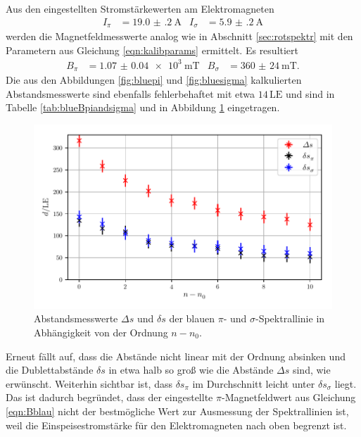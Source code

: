 Aus den eingestellten Stromstärkewerten am Elektromagneten
\begin{align}
  I_\pi &= \SI{19.0(2)}{\ampere} & I_\sigma &= \SI{5.9(2)}{\ampere}
\end{align}
werden die Magnetfeldmesswerte analog wie in Abschnitt \ref{sec:rotspektr} mit
den Parametern aus Gleichung \ref{eqn:kalibparams} ermittelt. Es resultiert
\begin{align}
  B_\pi &= \SI{1.07(4)e3}{\milli\tesla} & B_\sigma &= \SI{360(24)}{\milli\tesla}.
  \label{eqn:Bblau}
\end{align}
Die aus den Abbildungen \ref{fig:bluepi} und \ref{fig:bluesigma} kalkulierten Abstandsmesswerte
sind ebenfalls fehlerbehaftet mit etwa $14 \, \text{LE}$ und sind in Tabelle
\ref{tab:blueBpiandsigma} und in Abbildung \ref{fig:blueds} eingetragen.

\begin{figure}[H]
  \centering
  \includegraphics{Zusatzplots/blue_ds.pdf}
  \caption{Abstandsmesswerte $\Delta s$ und $\delta s$ der blauen $\pi$- und $\sigma$-Spektrallinie in Abhängigkeit von der Ordnung $n-n_0$.}
  \label{fig:blueds}
\end{figure}

Erneut fällt auf, dass die Abstände nicht linear mit der Ordnung absinken und die Dublettabstände $\delta s$ in etwa
halb so groß wie die Abstände $\Delta s$ sind, wie erwünscht. Weiterhin sichtbar ist, dass $\delta s_\pi$ im Durchschnitt
leicht unter $\delta s_\sigma$ liegt. Das ist dadurch begründet, dass der eingestellte $\pi$-Magnetfeldwert aus
Gleichung \eqref{eqn:Bblau} nicht der bestmögliche Wert zur Ausmessung der Spektrallinien ist, weil die Einspeisestromstärke
für den Elektromagneten nach oben begrenzt ist.

